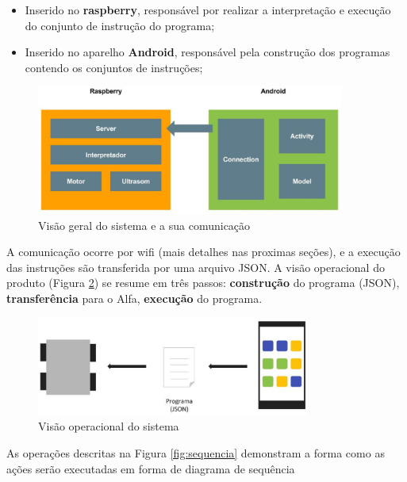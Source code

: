 \begin{itemize}
\item Inserido no \textbf{raspberry}, responsável por realizar a interpretação e execução do conjunto de instrução do programa;
\item Inserido no aparelho \textbf{Android}, responsável pela construção dos programas contendo os conjuntos de instruções;
\end{itemize}

\begin{figure}[H]
    \centering
    \includegraphics[width=0.9\textwidth]{figuras/overview_down.eps}
    \caption{Visão geral do sistema e a sua comunicação}
    \label{fig:overview_down}
\end{figure}

A comunicação ocorre por wifi (mais detalhes nas proximas seções), e a execução das instruções são transferida por uma arquivo JSON.
A visão operacional do produto (Figura \ref{fig:overview}) se resume em três passos: \textbf{construção} do programa (JSON), \textbf{transferência}
para o Alfa, \textbf{execução} do programa.

\begin{figure}[H]
    \centering
    \includegraphics[width=0.8\textwidth]{figuras/overview.eps}
    \caption{Visão operacional do sistema}
    \label{fig:overview}
\end{figure}

As operações descritas na Figura \ref{fig:sequencia} demonstram a forma como as ações serão executadas em forma de diagrama de sequência

